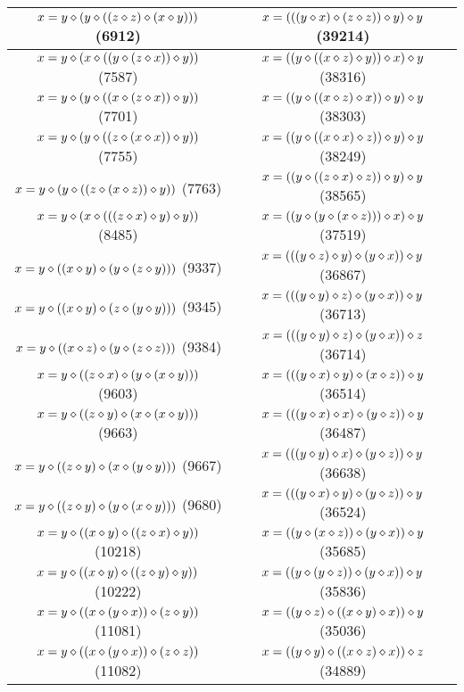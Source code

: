 \begin{table}[h]
\begin{tabular}{|c|c|}
$x = y \diamond (y \diamond ((z \diamond z) \diamond (x \diamond y)))$ (6912) & $x = (((y \diamond x) \diamond (z \diamond z)) \diamond y) \diamond y$ (39214) \\ \hline
$x = y \diamond (x \diamond ((y \diamond (z \diamond x)) \diamond y))$ (7587) & $x = ((y \diamond ((x \diamond z) \diamond y)) \diamond x) \diamond y$ (38316) \\ \hline
$x = y \diamond (y \diamond ((x \diamond (z \diamond x)) \diamond y))$ (7701) & $x = ((y \diamond ((x \diamond z) \diamond x)) \diamond y) \diamond y$ (38303) \\ \hline
$x = y \diamond (y \diamond ((z \diamond (x \diamond x)) \diamond y))$ (7755) & $x = ((y \diamond ((x \diamond x) \diamond z)) \diamond y) \diamond y$ (38249) \\ \hline
$x = y \diamond (y \diamond ((z \diamond (x \diamond z)) \diamond y))$ (7763) & $x = ((y \diamond ((z \diamond x) \diamond z)) \diamond y) \diamond y$ (38565) \\ \hline
$x = y \diamond (x \diamond (((z \diamond x) \diamond y) \diamond y))$ (8485) & $x = ((y \diamond (y \diamond (x \diamond z))) \diamond x) \diamond y$ (37519) \\ \hline
$x = y \diamond ((x \diamond y) \diamond (y \diamond (z \diamond y)))$ (9337) & $x = (((y \diamond z) \diamond y) \diamond (y \diamond x)) \diamond y$ (36867) \\ \hline
$x = y \diamond ((x \diamond y) \diamond (z \diamond (y \diamond y)))$ (9345) & $x = (((y \diamond y) \diamond z) \diamond (y \diamond x)) \diamond y$ (36713) \\ \hline
$x = y \diamond ((x \diamond z) \diamond (y \diamond (z \diamond z)))$ (9384) & $x = (((y \diamond y) \diamond z) \diamond (y \diamond x)) \diamond z$ (36714) \\ \hline
$x = y \diamond ((z \diamond x) \diamond (y \diamond (x \diamond y)))$ (9603) & $x = (((y \diamond x) \diamond y) \diamond (x \diamond z)) \diamond y$ (36514) \\ \hline
$x = y \diamond ((z \diamond y) \diamond (x \diamond (x \diamond y)))$ (9663) & $x = (((y \diamond x) \diamond x) \diamond (y \diamond z)) \diamond y$ (36487) \\ \hline
$x = y \diamond ((z \diamond y) \diamond (x \diamond (y \diamond y)))$ (9667) & $x = (((y \diamond y) \diamond x) \diamond (y \diamond z)) \diamond y$ (36638) \\ \hline
$x = y \diamond ((z \diamond y) \diamond (y \diamond (x \diamond y)))$ (9680) & $x = (((y \diamond x) \diamond y) \diamond (y \diamond z)) \diamond y$ (36524) \\ \hline
$x = y \diamond ((x \diamond y) \diamond ((z \diamond x) \diamond y))$ (10218) & $x = ((y \diamond (x \diamond z)) \diamond (y \diamond x)) \diamond y$ (35685) \\ \hline
$x = y \diamond ((x \diamond y) \diamond ((z \diamond y) \diamond y))$ (10222) & $x = ((y \diamond (y \diamond z)) \diamond (y \diamond x)) \diamond y$ (35836) \\ \hline
$x = y \diamond ((x \diamond (y \diamond x)) \diamond (z \diamond y))$ (11081) & $x = ((y \diamond z) \diamond ((x \diamond y) \diamond x)) \diamond y$ (35036) \\ \hline
$x = y \diamond ((x \diamond (y \diamond x)) \diamond (z \diamond z))$ (11082) & $x = ((y \diamond y) \diamond ((x \diamond z) \diamond x)) \diamond z$ (34889) \\ \hline

\end{tabular}
\end{table}
